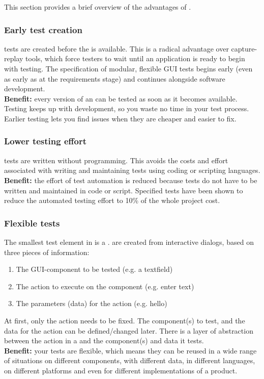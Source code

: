 This section provides a brief overview of the
advantages of \GD{}.


\subsubsection{Early test creation}
\gd{} tests are created before the \gdaut{} is available. This is a radical advantage over capture-replay tools, which force testers to wait until an application is ready to begin with testing. The specification of modular, flexible GUI tests begins early (even as early as at the requirements stage) and continues alongside software development.\\ 
\textbf{Benefit:} every version of an \gdaut{} can be tested as soon as it becomes available. Testing keeps up with development, so you waste no time in your test process. Earlier testing lets you find issues when they are cheaper and easier to fix.

\subsubsection{Lower testing effort}
\gd{} tests are written without programming. This avoids the costs and effort associated with writing and maintaining tests using coding or scripting languages. \\
\textbf{Benefit:} the effort of test automation is reduced because tests do not have to be written and maintained in code or script. Specified tests have been shown to reduce the automated testing effort to 10\% of the whole project cost. 
 
\subsubsection{Flexible tests}
The smallest test element in \gd{} is a \gdstep{}. \gdsteps{} are created from interactive dialogs, based on three pieces of information:
\begin{enumerate}
\item The GUI-component to be tested (e.g. a textfield)
\item The action to execute on the component (e.g. enter text)
\item The parameters (data) for the action (e.g. hello)
\end{enumerate}
At first, only the action needs to be fixed. The component(s) to test, and the data for the action can be defined/changed later. There is a layer of abstraction between the action in a \gdstep{} and the component(s) and data it tests. \\
\textbf{Benefit:} your tests are flexible, which means they can be reused in a wide range of situations  on different components, with different data, in different languages, on different platforms and even for different implementations of a product. 

